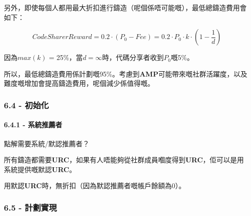 \documentclass[
]{article}
\begin{document}
另外，即使每個人都用最大折扣進行鑄造（呢個係唔可能嘅），最低總鑄造費用會如下：

\begin{equation}
CodeSharerReward = 0.2 \cdot (P_0 - Fee) = 0.2 \cdot P_0 \cdot k \cdot (1 - \frac{1}{d})
\end{equation}

因為\(max(k)\) = 25\%，當\(d = \infty\)時，代碼分享者收到\(P_0\)嘅5\%。

所以，最低總鑄造費用係計劃嘅95\%。考慮到\textbf{AMP}可能帶來嘅社群活躍度，以及難度嘅增加會提高鑄造費用，呢個減少係值得嘅。

\subsubsection{6.4 - 初始化}\label{ux521dux59cbux5316}

\paragraph{6.4.1 - 系統推薦者}\label{ux7cfbux7d71ux63a8ux85a6ux8005}

點解需要系統/默認推薦者？

所有鑄造都需要\textbf{URC}，如果有人唔能夠從社群成員嗰度得到\textbf{URC}，佢可以是用系統提供嘅默認\textbf{URC}。

用默認\textbf{URC}時，無折扣（因為默認推薦者嘅帳戶餘額為0）。

\subsubsection{6.5 - 計劃實現}\label{ux8a08ux5283ux5be6ux73fe}
\end{document}
